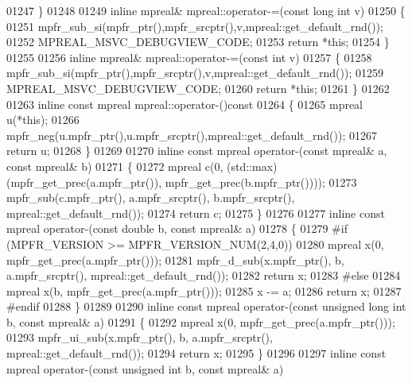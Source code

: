 \begin{DoxyCode}
01247 \}
01248 
01249 \textcolor{keyword}{inline} mpreal& mpreal::operator-=(\textcolor{keyword}{const} \textcolor{keywordtype}{long} \textcolor{keywordtype}{int} v)
01250 \{
01251     mpfr\_sub\_si(mpfr\_ptr(),mpfr\_srcptr(),v,mpreal::get\_default\_rnd());
01252     MPREAL\_MSVC\_DEBUGVIEW\_CODE;
01253     \textcolor{keywordflow}{return} *\textcolor{keyword}{this};
01254 \}
01255 
01256 \textcolor{keyword}{inline} mpreal& mpreal::operator-=(\textcolor{keyword}{const} \textcolor{keywordtype}{int} v)
01257 \{
01258     mpfr\_sub\_si(mpfr\_ptr(),mpfr\_srcptr(),v,mpreal::get\_default\_rnd());
01259     MPREAL\_MSVC\_DEBUGVIEW\_CODE;
01260     \textcolor{keywordflow}{return} *\textcolor{keyword}{this};
01261 \}
01262 
01263 \textcolor{keyword}{inline} \textcolor{keyword}{const} mpreal mpreal::operator-()\textcolor{keyword}{const}
01264 \textcolor{keyword}{}\{
01265     mpreal u(*\textcolor{keyword}{this});
01266     mpfr\_neg(u.mpfr\_ptr(),u.mpfr\_srcptr(),mpreal::get\_default\_rnd());
01267     \textcolor{keywordflow}{return} u;
01268 \}
01269 
01270 \textcolor{keyword}{inline} \textcolor{keyword}{const} mpreal operator-(\textcolor{keyword}{const} mpreal& a, \textcolor{keyword}{const} mpreal& b)
01271 \{
01272   mpreal c(0, (std::max)(mpfr\_get\_prec(a.mpfr\_ptr()), mpfr\_get\_prec(b.mpfr\_ptr())));
01273   mpfr\_sub(c.mpfr\_ptr(), a.mpfr\_srcptr(), b.mpfr\_srcptr(), mpreal::get\_default\_rnd());
01274   \textcolor{keywordflow}{return} c;
01275 \}
01276 
01277 \textcolor{keyword}{inline} \textcolor{keyword}{const} mpreal operator-(\textcolor{keyword}{const} \textcolor{keywordtype}{double}  b, \textcolor{keyword}{const} mpreal& a)
01278 \{
01279 \textcolor{preprocessor}{#if (MPFR\_VERSION >= MPFR\_VERSION\_NUM(2,4,0))}
01280     mpreal x(0, mpfr\_get\_prec(a.mpfr\_ptr()));
01281     mpfr\_d\_sub(x.mpfr\_ptr(), b, a.mpfr\_srcptr(), mpreal::get\_default\_rnd());
01282     \textcolor{keywordflow}{return} x;
01283 \textcolor{preprocessor}{#else}
01284     mpreal x(b, mpfr\_get\_prec(a.mpfr\_ptr()));
01285     x -= a;
01286     \textcolor{keywordflow}{return} x;
01287 \textcolor{preprocessor}{#endif}
01288 \}
01289 
01290 \textcolor{keyword}{inline} \textcolor{keyword}{const} mpreal operator-(\textcolor{keyword}{const} \textcolor{keywordtype}{unsigned} \textcolor{keywordtype}{long} \textcolor{keywordtype}{int} b, \textcolor{keyword}{const} mpreal& a)
01291 \{
01292     mpreal x(0, mpfr\_get\_prec(a.mpfr\_ptr()));
01293     mpfr\_ui\_sub(x.mpfr\_ptr(), b, a.mpfr\_srcptr(), mpreal::get\_default\_rnd());
01294     \textcolor{keywordflow}{return} x;
01295 \}
01296 
01297 \textcolor{keyword}{inline} \textcolor{keyword}{const} mpreal operator-(\textcolor{keyword}{const} \textcolor{keywordtype}{unsigned} \textcolor{keywordtype}{int} b, \textcolor{keyword}{const} mpreal& a)

\end{DoxyCode}
